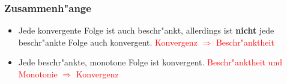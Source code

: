 \subsubsection{Zusammenh"ange}
\begin{itemize}
\item Jede konvergente Folge ist auch beschr"ankt, allerdings ist \textbf{nicht} jede beschr"ankte Folge auch konvergent. \textcolor{red}{Konvergenz $\Rightarrow$ Beschr"anktheit}
\item Jede beschr"ankte, monotone Folge ist konvergent. \textcolor{red}{Beschr"anktheit und Monotonie $\Rightarrow$ Konvergenz}
\end{itemize}
